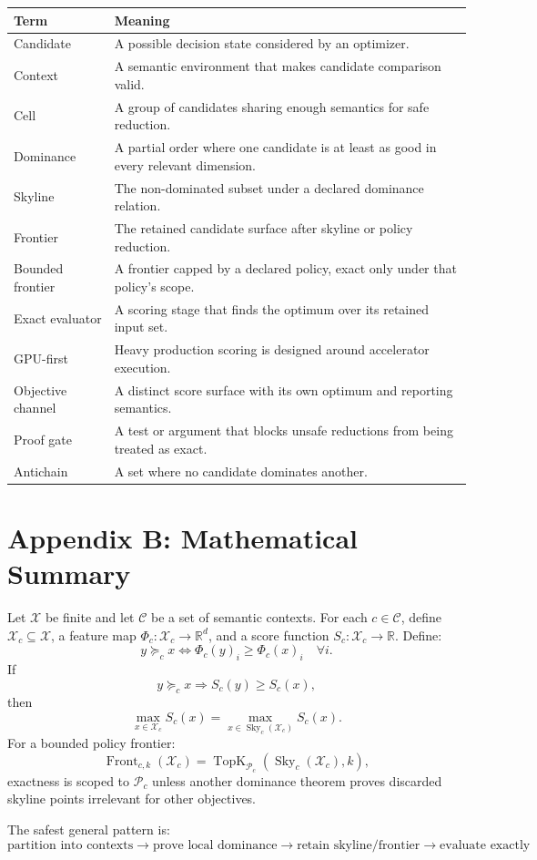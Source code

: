 \documentclass[11pt,oneside]{article}
\theoremstyle{definition}
\newcommand{\Sky}{\operatorname{Sky}}
\newcommand{\Front}{\operatorname{Front}}
\newcommand{\ctx}{\mathcal{C}}
\newcommand{\cand}{\mathcal{X}}
\newcommand{\stats}{\Phi}
\newcommand{\score}{S}
\newcommand{\R}{\mathbb{R}}
\newcommand{\Policy}{\mathcal{P}}
\begin{document}
\begin{longtable}{>{\raggedright\arraybackslash}p{}>{\raggedright\arraybackslash}p{}}
\toprule
\textbf{Term} & \textbf{Meaning} \\
\midrule
Candidate & A possible decision state considered by an optimizer. \\
Context & A semantic environment that makes candidate comparison valid. \\
Cell & A group of candidates sharing enough semantics for safe reduction. \\
Dominance & A partial order where one candidate is at least as good in every relevant dimension. \\
Skyline & The non-dominated subset under a declared dominance relation. \\
Frontier & The retained candidate surface after skyline or policy reduction. \\
Bounded frontier & A frontier capped by a declared policy, exact only under that policy's scope. \\
Exact evaluator & A scoring stage that finds the optimum over its retained input set. \\
GPU-first & Heavy production scoring is designed around accelerator execution. \\
Objective channel & A distinct score surface with its own optimum and reporting semantics. \\
Proof gate & A test or argument that blocks unsafe reductions from being treated as exact. \\
Antichain & A set where no candidate dominates another. \\
\bottomrule
\end{longtable}

\section*{Appendix B: Mathematical Summary}

Let \(\cand\) be finite and let \(\ctx\) be a set of semantic contexts. For each \(c\in\ctx\), define \(\cand_c\subseteq\cand\), a feature map \(\stats_c:\cand_c\rightarrow\R^d\), and a score function \(\score_c:\cand_c\rightarrow\R\). Define:
\[
  y\succeq_c x
  \iff
  \stats_c(y)_i\ge\stats_c(x)_i
  \quad\forall i.
\]
If
\[
  y\succeq_c x\Rightarrow\score_c(y)\ge\score_c(x),
\]
then
\[
  \max_{x\in\cand_c}\score_c(x)
  =
  \max_{x\in\Sky_c(\cand_c)}\score_c(x).
\]
For a bounded policy frontier:
\[
  \Front_{c,k}(\cand_c)
  =
  \operatorname{TopK}_{\Policy_c}\left(\Sky_c(\cand_c),k\right),
\]
exactness is scoped to \(\Policy_c\) unless another dominance theorem proves discarded skyline points irrelevant for other objectives.

The safest general pattern is:
\[
  \boxed{
  \text{partition into contexts}
  \rightarrow
  \text{prove local dominance}
  \rightarrow
  \text{retain skyline/frontier}
  \rightarrow
  \text{evaluate exactly}
  }
\]
\end{document}

